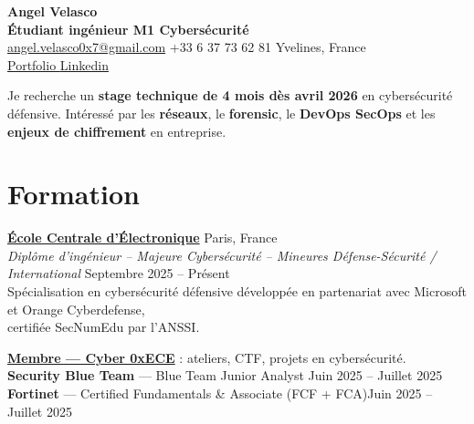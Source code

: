\documentclass[a4paper,10pt]{article}
\newcommand{\linkedtitle}[2]{\href{#1}{\textbf{\color{myblue}#2}}}
\begin{document}
\begin{center}
    {\LARGE \textbf{Angel Velasco}}\\[2pt]
    {\small \textbf{Étudiant ingénieur M1 Cybersécurité}}\\[5pt]
     
    \small
    \href{mailto:angel.velasco0x7@gmail.com}{angel.velasco0x7@gmail.com} \quad
    +33 6 37 73 62 81 \quad
    Yvelines, France \\
    {\small \href{https://angel0x7.github.io}{Portfolio } \href{https://www.linkedin.com/in/angel-velasco-0x7/}{Linkedin}} 
\end{center}
    





\begin{center}
Je recherche un \textbf{stage technique de 4 mois dès avril 2026} en cybersécurité défensive.  
Intéressé par les \textbf{réseaux}, le \textbf{forensic}, le \textbf{DevOps SecOps} et les \textbf{enjeux de chiffrement} en entreprise.

\end{center}




\section*{Formation}

\noindent
\linkedtitle{https://www.ece.fr/en/program/engineering-cycle-bac4-information-systems-and-cybersecurity-major/}{École Centrale d'Électronique} \hfill Paris, France \\
\emph{Diplôme d'ingénieur – Majeure Cybersécurité – Mineures Défense-Sécurité / International} \hfill Septembre 2025 -- Présent \\
Spécialisation en cybersécurité défensive développée en partenariat avec Microsoft et Orange Cyberdefense,\\ certifiée SecNumEdu par l’ANSSI. 

\noindent
\textbf{\href{https://www.linkedin.com/company/asso0xece/}{Membre — Cyber 0xECE}} : ateliers, CTF, projets en cybersécurité. \\
\textbf{Security Blue Team} — Blue Team Junior Analyst \hfill Juin 2025 -- Juillet 2025 \\
\textbf{Fortinet} — Certified Fundamentals \& Associate (FCF + FCA)\hfill Juin 2025 -- Juillet 2025 
\end{document}

